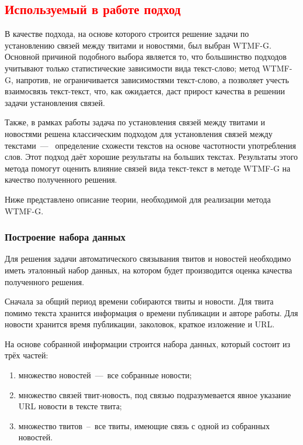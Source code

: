 \subsection{\textcolor{red}{Используемый в работе подход}}
    В качестве подхода, на основе которого строится решение задачи по установлению связей между твитами и новостями, был выбран WTMF-G.
    Основной причиной подобного выбора является то, что большинство подходов учитывают только статистические зависимости вида текст-слово;
    метод WTMF-G, напротив, не ограничивается зависимостями текст-слово, а позволяет учесть взаимосвязь текст-текст,
    что, как ожидается, даст прирост качества в решении задачи установления связей.

    Также, в рамках работы задача по установления связей между твитами и новостями решена классическим подходом для установления связей между текстами~---~
    определение схожести текстов на основе частотности употребления слов. Этот подход даёт хорошие результаты на больших текстах.
    Результаты этого метода помогут оценить влияние связей вида текст-текст в методе WTMF-G на качество полученного решения.

    Ниже представлено описание теории, необходимой для реализации метода WTMF-G.

    \subsubsection{Построение набора данных}
        Для решения задачи автоматического связывания твитов и новостей необходимо иметь эталонный набор данных, на котором будет производится оценка качества полученного решения.

        Сначала за общий период времени собираются твиты и новости.
        Для твита помимо текста хранится информация о времени публикации и авторе работы. Для новости хранится время публикации, заколовок, краткое изложение и URL.

        На основе собранной информации строится набора данных, который состоит из трёх частей:
        \begin{enumerate}
            \item множество новостей~---~все собранные новости;
            \item множество связей твит-новость, под связью подразумевается явное указание URL новости в тексте твита;
            \item множество твитов~--~все твиты, имеющие связь с одной из собранных новостей.
        \end{enumerate}
